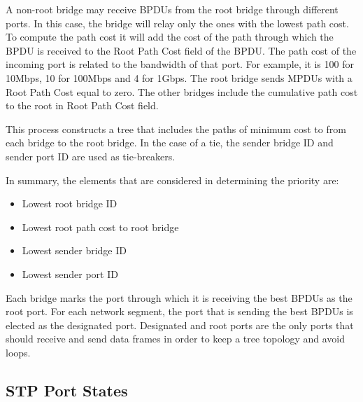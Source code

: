 A non-root bridge may receive BPDUs from the root bridge through different ports.
In this case, the bridge will relay only the ones with the lowest path cost.
To compute the path cost it will add the cost of the path through which the BPDU is received to the Root Path Cost field of the BPDU.
The path cost of the incoming port is related to the bandwidth of that port.
For example, it is 100 for 10Mbps, 10 for 100Mbps and 4 for 1Gbps.
The root bridge sends MPDUs with a Root Path Cost equal to zero.
The other bridges include the cumulative path cost to the root in Root Path Cost field.

This process constructs a tree that includes the paths of minimum cost to from each bridge to the root bridge.
In the case of a tie, the sender bridge ID and sender port ID are used as tie-breakers.

In summary, the elements that are considered in determining the priority are:
\begin{itemize}
\item Lowest root bridge ID
\item Lowest root path cost to root bridge
\item Lowest sender bridge ID
\item Lowest sender port ID
\end{itemize}

Each bridge marks the port through which it is receiving the best BPDUs as the root port.
For each network segment, the port that is sending the best BPDUs is elected as the designated port.
Designated and root ports are the only ports that should receive and send data frames in order to keep a tree topology and avoid loops.

\subsection{STP Port States}

